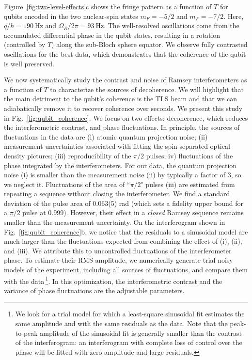 Figure~\ref{fig:two-level-effects}c shows the fringe pattern as a function of $T$ for qubits encoded in the two nuclear-spin states $m_F = -5/2$ and $m_F = -7/2$. Here, $q / h = \SI{190}{\hertz}$ and $\Omega_R / 2 \pi = \SI{93}{\hertz}$. The well-resolved oscillations come from the accumulated differential phase in the qubit states, resulting in a rotation (controlled by $T$) along the sub-Bloch sphere equator. We observe fully contrasted oscillations for the best data,  which demonstrates that the coherence of the qubit is well preserved. 

We now systematically study  the contrast and noise of Ramsey interferometers as a function of $T$ to characterize the sources of decoherence. We will highlight that the main detriment to the qubit's coherence is the TLS beam and that we can adiabatically remove it to recover coherence over seconds. We present this study in Fig.~\ref{fig:qubit_coherence}. We focus on two effects: decoherence, which reduces the interferometric contrast, and phase fluctuations. In principle, the sources of fluctuations in the data are (i) atomic quantum projection noise; (ii) measurement uncertainties associated with fitting the spin-separated optical density pictures; (iii) reproducibility of the $\pi/2$ pulses; iv) fluctuations of the phase integrated by the interferometers. For our data, the quantum projection noise (i) is smaller than the measurement noise (ii) by typically a factor of 3, so we neglect it. Fluctuations of the area of ``$\pi/2$" pulses (iii) are estimated from repeating a sequence without closing the interferometer. We find a standard deviation of the pulse area of 0.063(5) rad (which sets a fidelity upper bound for a $\pi/2$ pulse at 0.999). However, their effect in a \textit{closed} Ramsey sequence remains smaller than the measurement uncertainty. On the interferogram shown in Fig.~\ref{fig:qubit_coherence}b, we notice that the residuals to a sinusoidal model are much larger than the fluctuations expected from combining the effect of (i), (ii), and (iii). We attribute this to uncontrolled fluctuations of the interferometer phase. To estimate their RMS amplitude, we numerically generate trial noisy models of the experiment, including all sources of fluctuations, and compare them with the data\,\footnote{We look for a trial model for which a least-square sinusoidal fit estimates the same amplitude and with the same residuals as the data. Note that the peak-to-peak amplitude of the sinusoidal fit is generally smaller than the contrast of the interferogram: an interferogram with complete loss of control over the phase will be fitted with zero amplitude and large residuals.}. In this optimization, the interferometric contrast and the variance of phase fluctuations are the adjustable parameters.


